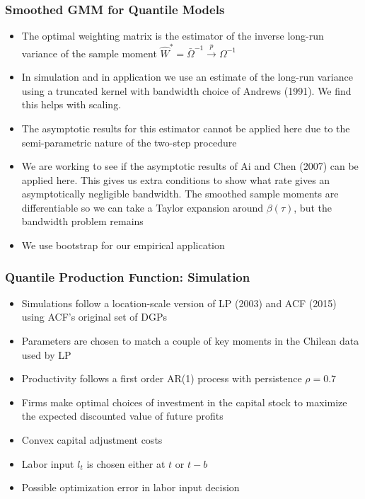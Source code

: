 \documentclass{beamer}
\begin{document}

\begin{frame}
\frametitle{Smoothed GMM for Quantile Models}
\begin{itemize}
	\item The optimal weighting matrix is the estimator of the inverse long-run variance of the sample moment $\hat{W}^{*}=\bar{\Omega}^{-1}\overset{p}{\to}\Omega^{-1}$
	\item In simulation and in application we use an estimate of the long-run variance using a truncated kernel with bandwidth choice of Andrews (1991). We find this helps with scaling.
	
	\item The asymptotic results for this estimator cannot be applied here due to the semi-parametric nature of the two-step procedure
	\item We are working to see if the asymptotic results of Ai and Chen (2007) can be applied here. This gives us extra conditions to show what rate gives an asymptotically negligible bandwidth. The smoothed sample moments are differentiable so we can take a Taylor expansion around $\beta(\tau)$, but the bandwidth problem remains
	
	\item We use bootstrap for our empirical application
\end{itemize}
\end{frame}


\begin{frame}
\frametitle{Quantile Production Function: Simulation}
\begin{itemize}
	\item Simulations follow a location-scale version of LP (2003) and ACF (2015) using ACF's original set of DGPs 
	\item Parameters are chosen to match a couple of key moments in the Chilean data used by LP
	\item Productivity follows a first order AR(1) process with persistence $\rho=0.7$
	\item Firms make optimal choices of investment in the capital stock to maximize the expected discounted value of future profits
	\item Convex capital adjustment costs
	\item Labor input $l_{t}$ is chosen either at $t$ or $t-b$
	\item Possible optimization error in labor input decision
\end{itemize}
\end{frame}
\end{document}
